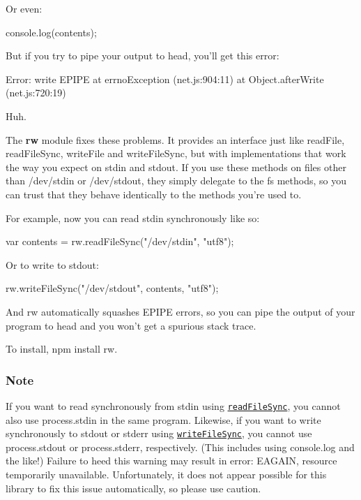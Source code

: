 Or even\+:


\begin{DoxyCode}
console.log(contents);
\end{DoxyCode}


But if you try to pipe your output to {\ttfamily head}, you’ll get this error\+:


\begin{DoxyCode}
Error: write EPIPE
    at errnoException (net.js:904:11)
    at Object.afterWrite (net.js:720:19)
\end{DoxyCode}


Huh.

The {\bfseries rw} module fixes these problems. It provides an interface just like read\+File, read\+File\+Sync, write\+File and write\+File\+Sync, but with implementations that work the way you expect on stdin and stdout. If you use these methods on files other than /dev/stdin or /dev/stdout, they simply delegate to the fs methods, so you can trust that they behave identically to the methods you’re used to.

For example, now you can read stdin synchronously like so\+:


\begin{DoxyCode}
var contents = rw.readFileSync("/dev/stdin", "utf8");
\end{DoxyCode}


Or to write to stdout\+:


\begin{DoxyCode}
rw.writeFileSync("/dev/stdout", contents, "utf8");
\end{DoxyCode}


And rw automatically squashes E\+P\+I\+PE errors, so you can pipe the output of your program to {\ttfamily head} and you won’t get a spurious stack trace.

To install, {\ttfamily npm install rw}.

\subsubsection*{Note}

If you want to read synchronously from stdin using \href{#readFileSync}{\tt read\+File\+Sync}, you cannot also use process.\+stdin in the same program. Likewise, if you want to write synchronously to stdout or stderr using \href{#writeFileSync}{\tt write\+File\+Sync}, you cannot use process.\+stdout or process.\+stderr, respectively. (This includes using console.\+log and the like!) Failure to heed this warning may result in error\+: E\+A\+G\+A\+IN, resource temporarily unavailable. Unfortunately, it does not appear possible for this library to fix this issue automatically, so please use caution.

